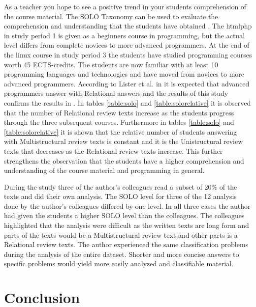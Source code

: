 \documentclass[twoside,twocolumn,a4paper,11pt,english]{article}
\begin{document}
As a teacher you hope to see a positive trend in your students comprehension of the course material. The SOLO Taxonomy can be used to evaluate the comprehension and understanding that the students have obtained \cite{biggs1982evaluation}. The htmlphp in study period 1 is given as a beginners course in programming, but the actual level differs from complete novices to more advanced programmers. At the end of the linux course in study period 3 the students have studied programming courses worth 45 ECTS-credits. The students are now familiar with at least 10 programming languages and technologies and have moved from novices to more advanced programmers. According to Lister et al. in \cite{lister2006not} it is expected that advanced programmers answer with Relational answers and the results of this study confirms the results in \cite{lister2006not}. In tables \ref{table:solo} and \ref{table:solorelative} it is observed that the number of Relational review texts increase as the students progress through the three subsequent courses. Furthermore in tables \ref{table:solo} and \ref{table:solorelative} it is shown that the relative number of students answering with Multistructural review texts is constant and it is the Unistructural review texts that decreases as the Relational review texts increase. This further strengthens the observation that the students have a higher comprehension and understanding of the course material and programming in general.

During the study three of the author's colleagues read a subset of 20\% of the texts and did their own analysis. The SOLO level for three of the 12 analysis done by the author's colleagues differed by one level. In all three cases the author had given the students a higher SOLO level than the colleagues. The colleagues highlighted that the analysis were difficult as the written texts are long form and parts of the texts would be a Multistructural review text and other parts is a Relational review texts. The author experienced the same classification problems during the analysis of the entire dataset. Shorter and more concise answers to specific problems would yield more easily analyzed and classifiable material.




\section{Conclusion}
\end{document}

